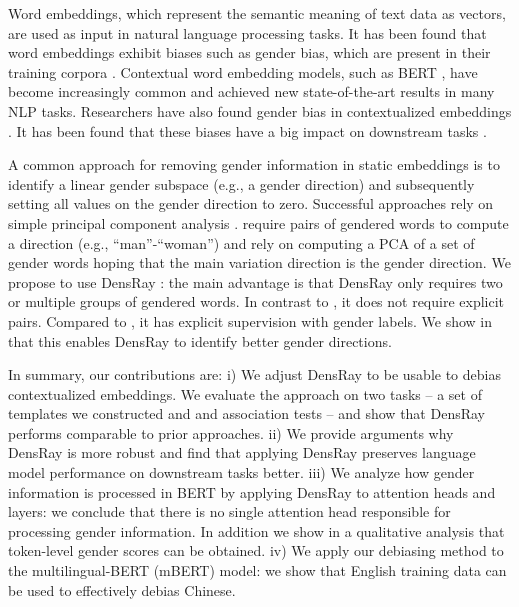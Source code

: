 Word embeddings, which represent the semantic meaning of
text data as vectors, are used as input in natural language
processing tasks. It has been found that word embeddings
exhibit biases such as gender bias, which are present in their training
corpora \cite{bolukbasi2016man,caliskan2017semantics,garg2018word}. Contextual word
embedding models, such as BERT \cite{devlin2018bert}, have
become increasingly common and achieved new state-of-the-art
results in many NLP tasks. Researchers have also found
gender bias in contextualized
embeddings \cite{zhao2019gender,may2019measuring}. It has been found that these biases have a big impact on downstream tasks \cite{vanmassenhove-etal-2018-getting,moryossef-etal-2019-filling,rudinger2018gender,zhao2018gender}.

A common approach for removing gender information in static
embeddings is to identify a linear gender subspace (e.g., a
gender direction) and subsequently setting all values on the
gender direction to zero. Successful approaches rely on simple
principal component
analysis \cite{bolukbasi2016man,mu2018all}. 
require pairs of gendered words to compute a direction
(e.g., ``man''-``woman'') and  rely on
computing a PCA of a set of gender words hoping that the
main variation direction is the gender direction. We propose to use
DensRay \cite{dufter2019analytical}: the main advantage is
that DensRay only requires two or multiple groups of
gendered words. In contrast to , it
does not require explicit pairs. Compared
to , it has explicit supervision with gender
labels. We show in  that this enables
DensRay to identify better gender directions.

In summary, our contributions are: 
i) We adjust DensRay to be usable to debias contextualized embeddings.
We evaluate the approach on two tasks -- a set of templates
we constructed and and association tests -- and show that DensRay performs comparable to prior approaches. 
ii) We provide arguments why DensRay is more robust and find that applying DensRay preserves language model performance on downstream tasks better.
iii) We analyze how gender information is processed in BERT by applying DensRay to attention heads and layers: we conclude that there is no single attention head responsible for processing gender information. In addition we show in a qualitative analysis that token-level gender scores can be obtained. 
iv) We apply our debiasing method to the multilingual-BERT (mBERT) model: we show that English training data can be used to effectively debias Chinese.
